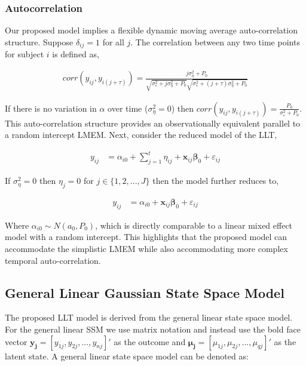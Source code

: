 \documentclass[
]{article}
\begin{document}
\hypertarget{autocorrelation}{%
\subsubsection{Autocorrelation}\label{autocorrelation}}

Our proposed model implies a flexible dynamic moving average auto-correlation structure. Suppose \(\delta_{ij} = 1\) for all \(j\). The correlation between any two time points for subject \(i\) is defined as,

\begin{align*}
corr(y_{ij}, y_{i(j+\tau)}) = \frac{j\sigma^2_\eta + P_0}{\sqrt{\sigma^2_\varepsilon + j\sigma^2_\eta + P_0}\sqrt{\sigma^2_\varepsilon + (j+\tau)\sigma^2_\eta + P_0}}
\end{align*}

If there is no variation in \(\alpha\) over time (\(\sigma^2_\eta = 0\)) then \(corr(y_{ij}, y_{i(j+\tau)}) = \frac{P_0}{\sigma^2_\varepsilon + P_0}\). This auto-correlation structure provides an observationally equivalent parallel to a random intercept LMEM. Next, consider the reduced model of the LLT,

\begin{align*}
y_{ij} &= \alpha_{i0} + \sum^t_{j = 1} \eta_{ij} + \boldsymbol{x}_{ij} \boldsymbol{\beta}_0 + \varepsilon_{ij}
\end{align*}

If \(\sigma^2_\eta = 0\) then \(\eta_j = 0\) for \(j \in \{1, 2, ..., J\}\) then the model further reduces to,

\begin{align*}
y_{ij} &= \alpha_{i0} + \boldsymbol{x}_{ij} \boldsymbol{\beta}_0 + \varepsilon_{ij}
\end{align*}

Where \(\alpha_{i0}\sim N(a_0, P_0)\), which is directly comparable to a linear mixed effect model with a random intercept. This highlights that the proposed model can accommodate the simplistic LMEM while also accommodating more complex temporal auto-correlation.

\hypertarget{general-linear-gaussian-state-space-model}{%
\subsection{General Linear Gaussian State Space Model}\label{general-linear-gaussian-state-space-model}}

The proposed LLT model is derived from the general linear state space model. For the general linear SSM we use matrix notation and instead use the bold face vector \(\boldsymbol{y_j} = [y_{1j}, y_{2j}, ..., y_{nj}]'\) as the outcome and \(\boldsymbol{\mu_j} = [\mu_{1j}, \mu_{2j}, ..., \mu_{qj}]'\) as the latent state. A general linear state space model can be denoted as:
\end{document}
